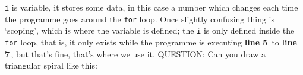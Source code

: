 \documentclass[11pt,a4paper]{scrartcl}
\newcommand{\lnn}[1]{\textbf{line #1}\,}
\begin{document}
\begin{center}
\end{center}
\texttt{i} is variable, it stores some data, in this case a number
which changes each time the programme goes around the \texttt{for}
loop. Once slightly confusing thing is \lq{}scoping\rq{}, which is
where the variable is defined; the \texttt{i} is only defined inside
the \texttt{for} loop, that is, it only exists while the programme is
executing \lnn{5} to \lnn{7}, but that's fine, that's where we use it.
QUESTION: Can you draw a triangular spiral like this:
\begin{center}
\end{center}
\end{document}
